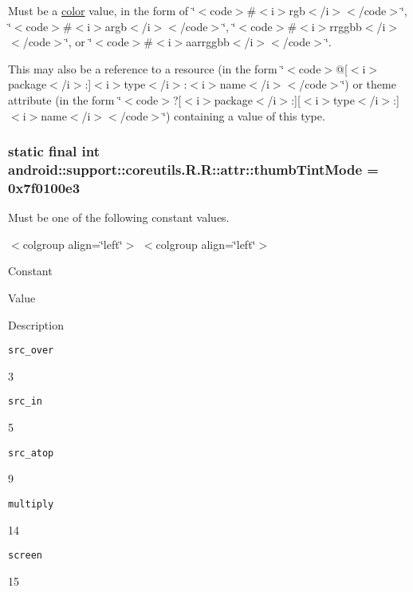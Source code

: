 Must be a \hyperlink{classandroid_1_1support_1_1coreutils_1_1_r_1_1color}{color} value, in the form of \char`\"{}$<$code$>$\#$<$i$>$rgb$<$/i$>$$<$/code$>$\char`\"{}, \char`\"{}$<$code$>$\#$<$i$>$argb$<$/i$>$$<$/code$>$\char`\"{}, \char`\"{}$<$code$>$\#$<$i$>$rrggbb$<$/i$>$$<$/code$>$\char`\"{}, or \char`\"{}$<$code$>$\#$<$i$>$aarrggbb$<$/i$>$$<$/code$>$\char`\"{}. 

This may also be a reference to a resource (in the form \char`\"{}$<$code$>$@\mbox{[}$<$i$>$package$<$/i$>$:\mbox{]}$<$i$>$type$<$/i$>$:$<$i$>$name$<$/i$>$$<$/code$>$\char`\"{}) or theme attribute (in the form \char`\"{}$<$code$>$?\mbox{[}$<$i$>$package$<$/i$>$:\mbox{]}\mbox{[}$<$i$>$type$<$/i$>$:\mbox{]}$<$i$>$name$<$/i$>$$<$/code$>$\char`\"{}) containing a value of this type. \hypertarget{classandroid_1_1support_1_1coreutils_1_1_r_1_1attr_040206dafbf11db013fcb10c0175eeb4}{
\subsubsection[{thumbTintMode}]{\setlength{\rightskip}{0pt plus 5cm}static final int android::support::coreutils.R.R::attr::thumbTintMode = 0x7f0100e3}}
\label{classandroid_1_1support_1_1coreutils_1_1_r_1_1attr_040206dafbf11db013fcb10c0175eeb4}


Must be one of the following constant values. \begin{TabularC}{0}
\hline
\end{TabularC}
$<$colgroup align=\char`\"{}left\char`\"{}$>$ $<$colgroup align=\char`\"{}left\char`\"{}$>$ 

Constant

Value

Description 

{\tt src\_\-over}

3

{\tt src\_\-in}

5

{\tt src\_\-atop}

9

{\tt multiply}

14

{\tt screen}

15

